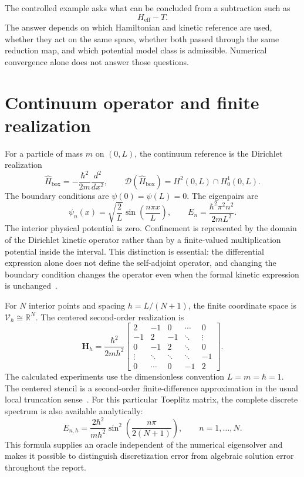 \documentclass[11pt]{article}
\begin{document}
The controlled example asks what can be concluded from a subtraction such as
\begin{equation}
  H_{\mathrm{eff}}-T.
\end{equation}
The answer depends on which Hamiltonian and kinetic reference are used, whether
they act on the same space, whether both passed through the same reduction map,
and which potential model class is admissible. Numerical convergence alone does
not answer those questions.

\section{Continuum operator and finite realization}

For a particle of mass $m$ on $(0,L)$, the continuum reference is the
Dirichlet realization
\begin{equation}
  \hat H_{\mathrm{box}}
  =-\frac{\hbar^2}{2m}\frac{d^2}{dx^2},
  \qquad
  \mathcal D(\hat H_{\mathrm{box}})=H^2(0,L)\cap H_0^1(0,L).
\end{equation}
The boundary conditions are $\psi(0)=\psi(L)=0$. The eigenpairs are
\begin{equation}
  \psi_n(x)=\sqrt{\frac{2}{L}}\sin\!\left(\frac{n\pi x}{L}\right),
  \qquad
  E_n=\frac{\hbar^2\pi^2n^2}{2mL^2}.
\end{equation}
The interior physical potential is zero. Confinement is represented by the
domain of the Dirichlet kinetic operator rather than by a finite-valued
multiplication potential inside the interval. This distinction is essential:
the differential expression alone does not define the self-adjoint operator,
and changing the boundary condition changes the operator even when the formal
kinetic expression is unchanged~\cite{bonneau2001,angelone2024}.

For $N$ interior points and spacing $h=L/(N+1)$, the finite coordinate space is
$\mathcal V_h\cong\mathbb R^N$. The centered second-order realization is
\begin{equation}
\mathbf H_h
=
\frac{\hbar^2}{2mh^2}
\begin{bmatrix}
2 & -1 & 0 & \cdots & 0\\
-1 & 2 & -1 & \ddots & \vdots\\
0 & -1 & 2 & \ddots & 0\\
\vdots & \ddots & \ddots & \ddots & -1\\
0 & \cdots & 0 & -1 & 2
\end{bmatrix}.
\end{equation}
The calculated experiments use the dimensionless convention $L=m=\hbar=1$.
The centered stencil is a second-order finite-difference approximation in the
usual local truncation sense~\cite{strikwerda2004}. For this particular Toeplitz
matrix, the complete discrete spectrum is also available analytically:
\begin{equation}
  E_{n,h}
  =\frac{2\hbar^2}{mh^2}
   \sin^2\!\left(\frac{n\pi}{2(N+1)}\right),
  \qquad n=1,\ldots,N.
\end{equation}
This formula supplies an oracle independent of the numerical eigensolver and
makes it possible to distinguish discretization error from algebraic solution
error throughout the report.
\end{document}
